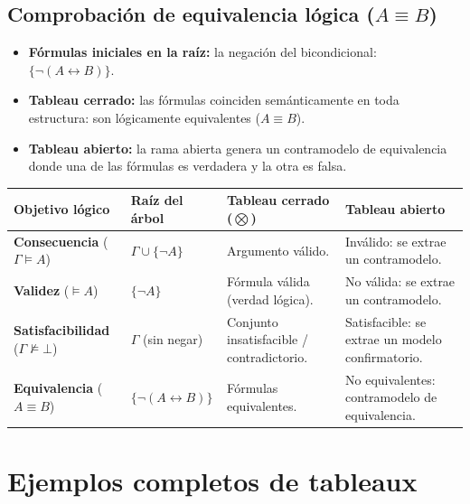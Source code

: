 \subsection{Comprobación de equivalencia lógica (\texorpdfstring{$A \equiv B$}{A equiv B})}
\begin{itemize}
    \item \textbf{Fórmulas iniciales en la raíz:} la negación del bicondicional: $\{\neg (A \leftrightarrow B)\}$.
    \item \textbf{Tableau cerrado:} las fórmulas coinciden semánticamente en toda estructura: son lógicamente equivalentes ($A \equiv B$).
    \item \textbf{Tableau abierto:} la rama abierta genera un contramodelo de equivalencia donde una de las fórmulas es verdadera y la otra es falsa.
\end{itemize}

\begin{center}
\renewcommand{\arraystretch}{1.4}
\begin{tabular}{|>{\raggedright\arraybackslash}p{3.6cm}|>{\raggedright\arraybackslash}p{3.2cm}|>{\raggedright\arraybackslash}p{4.2cm}|>{\raggedright\arraybackslash}p{4.2cm}|}
\hline
\textbf{Objetivo lógico} & \textbf{Raíz del árbol} & \textbf{Tableau cerrado ($\bigotimes$)} & \textbf{Tableau abierto} \\
\hline
\textbf{Consecuencia} ($\Gamma \models A$) & $\Gamma \cup \{\neg A\}$ & Argumento válido. & Inválido: se extrae un contramodelo. \\
\hline
\textbf{Validez} ($\models A$) & $\{\neg A\}$ & Fórmula válida (verdad lógica). & No válida: se extrae un contramodelo. \\
\hline
\textbf{Satisfacibilidad} ($\Gamma\not\models\bot$) & $\Gamma$ (sin negar) & Conjunto insatisfacible / contradictorio. & Satisfacible: se extrae un modelo confirmatorio. \\
\hline
\textbf{Equivalencia} ($A \equiv B$) & $\{\neg(A \leftrightarrow B)\}$ & Fórmulas equivalentes. & No equivalentes: contramodelo de equivalencia. \\
\hline
\end{tabular}
\end{center}

\section{Ejemplos completos de tableaux}

